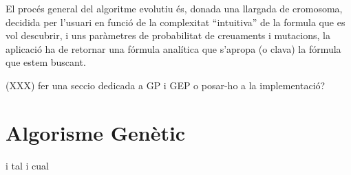 \documentclass[titlepage,a4paper,12pt]{book}
\begin{document}
El procés general del algoritme evolutiu és, donada una llargada de cromosoma,
decidida per l'usuari en funció de la complexitat ``intuitiva'' de la formula
que es vol descubrir, i uns paràmetres de probabilitat de creuaments i
mutacions, la aplicació ha de retornar una fórmula analítica que s'apropa (o
clava) la fórmula que estem buscant.

(XXX) fer una seccio dedicada a GP i GEP o posar-ho a la implementació?


\section{Algorisme Genètic} %
\label{sec:Algorisme Genetic}





i tal i cual
\end{document}
